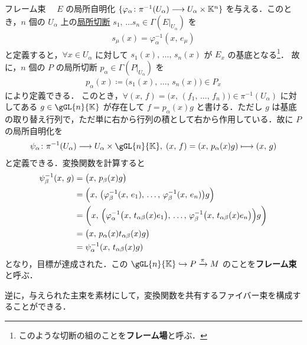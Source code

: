 \documentclass[TQFT_main]{subfiles}
\begin{document}
\begin{myexample}[label=def:framebundle]{フレーム束}
    　$E$ の局所自明化 $\{\varphi_\alpha \colon \pi^{-1}(U_\alpha) \longrightarrow U_\alpha \times \mathbb{K}^n \}$ を与える．このとき，$n$ 個の $U_\alpha$ 上の\hyperref[def.section]{局所切断} $s_1,\, \dots s_n \in \Gamma(E|_{U_\alpha})$ を
    \begin{align}
        s_\mu(x) = \varphi_\alpha^{-1} (x,\, e_\mu)
    \end{align}
    と定義すると，$\forall x \in U_\alpha$ に対して $s_1(x),\, \dots ,\, s_n(x)$ が $E_x$ の基底となる\footnote{このような切断の組のことを\textbf{フレーム場}と呼ぶ．}．
    故に，$n$ 個の $P$ の局所切断 $p_\alpha \in \Gamma(P|_{U_\alpha})$ を
    \begin{align}
        p_\alpha (x) \coloneqq \bigl( s_1(x),\, \dots,\, s_n(x) \bigr) \in P_x
    \end{align}
    により定義できる．
    このとき，$\forall (x,\, f) = \bigl(x,\, (f_1,\, \dots,\, f_n)\bigr) \in \pi^{-1}(U_\alpha)$ に対してある $g \in \gGL{n}{\mathbb{K}}$ が存在して $f = p_\alpha(x) g$ と書ける．ただし $g$ は基底の取り替え行列で，ただ単に右から行列の積として右から作用している．故に $P$ の局所自明化を
    \begin{align}
        \psi_\alpha \colon \pi^{-1}(U_\alpha) \lto U_\alpha \times \gGL{n}{\mathbb{K}},\; (x,\, f) = (x,\, p_\alpha (x) g)\lmto (x,\, g)
    \end{align}
    と定義できる．変換関数を計算すると
    \begin{align}
        \psi_\beta^{-1}(x,\, g) 
        &= \bigl(x,\, p_\beta (x) g\bigr) \\
        &= \Bigl(x,\, \bigl(\varphi_\beta^{-1}(x,\, e_1),\, \dots,\, \varphi_\beta^{-1}(x,\, e_n)\bigr) g\Bigr) \\
        &= \biggl(x,\, \Bigl(\varphi_\alpha^{-1}\bigl(x,\, t_{\alpha\beta}(x) e_1\bigr),\, \dots,\, \varphi_\beta^{-1}\bigl(x,\, t_{\alpha\beta}(x) e_n\bigr)\Bigr) g\biggr) \\
        &= \bigl(x,\, p_{\alpha} (x) t_{\alpha\beta}(x) g\bigr) \\
        &= \psi_\alpha^{-1} (x,\, t_{\alpha\beta}(x) g)
    \end{align}
    となり，目標が達成された．この $\gGL{n}{\mathbb{K}} \hookrightarrow P \xrightarrow{\pi} M$ のことを\textbf{フレーム束}と呼ぶ．
\end{myexample}

逆に，与えられた主束を素材にして，変換関数を共有するファイバー束を構成することができる．
\end{document}
